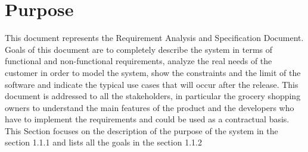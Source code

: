 \section{Purpose}

This document represents the Requirement Analysis and Specification Document. Goals of this document are to completely describe the system in terms of functional and non-functional requirements, analyze the real needs of the customer in order to model the system, show the constraints and the limit of the software and indicate the typical use cases that will occur after the release. This document is addressed to all the stakeholders, in particular the grocery shopping owners to understand the main features of the product and the developers who have to implement the requirements and could be used as a contractual basis.\\
This Section focuses on the description of the purpose of the system in the section 1.1.1 and lists all the goals in the section 1.1.2
 
 
 
